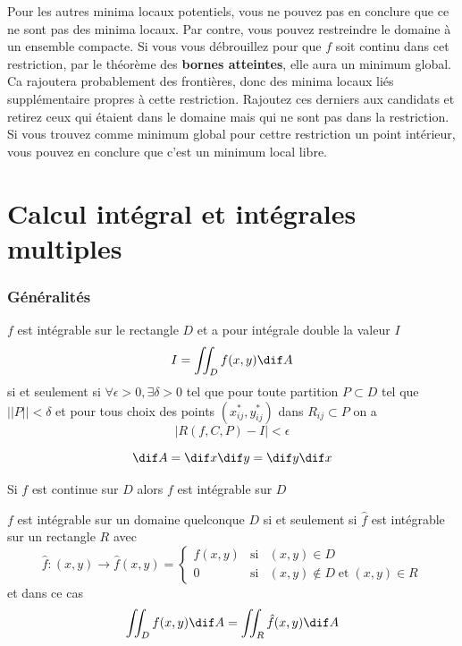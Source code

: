 Pour les autres minima locaux potentiels, vous ne pouvez pas en conclure que ce ne sont pas des minima locaux.
Par contre, vous pouvez restreindre le domaine à un ensemble compacte.
Si vous vous débrouillez pour que $f$ soit continu dans cet restriction, par le théorème des \textbf{bornes atteintes},
elle aura un minimum global.
Ca rajoutera probablement des frontières, donc des minima locaux liés supplémentaire propres à cette restriction.
Rajoutez ces derniers aux candidats et retirez ceux qui étaient dans le domaine mais qui ne sont pas dans la restriction.
Si vous trouvez comme minimum global pour cettre restriction un point intérieur,
vous pouvez en conclure que c'est un minimum local libre.


\part{Calcul intégral et intégrales multiples}

\section{Généralités}

\begin{mydef} $f$ est intégrable sur le rectangle $D$ et a pour intégrale double la valeur $I$
	\[ I = \iint_D f(x,y) \dif A \]
	si et seulement si $\forall \epsilon > 0, \exists \delta > 0$ tel que pour toute partition $P \subset D$ tel que $||P|| < \delta$ et pour tous choix des points $(x_{ij}^{*},y_{ij}^{*})$ dans $R_{ij} \subset P$ on a
	\[ |R(f,C,P) - I| < \epsilon \]
\end{mydef}

\begin{myrem}
	\[ \dif A = \dif x \dif y = \dif y \dif x \]
\end{myrem}

\begin{mytheo}
	Si $f$ est continue sur $D$ alors $f$ est intégrable sur $D$
\end{mytheo}

\begin{myprop} $f$ est intégrable sur un domaine quelconque $D$ si et seulement si $\hat{f}$ est intégrable sur un rectangle $R$ avec
	\[ \hat{f} : (x,y) \to \hat{f}(x,y) = \left\{
	\begin{array}{lll} f(x,y) & \text{si} & (x,y) \in D \\ 0 & \text{si} & (x,y) \notin D  \; \text{et} \; (x,y) \in R
	\end{array}
	\right.
	\]
	et dans ce cas
	\[ \iint_D f(x,y) \dif A = \iint_R \hat{f}(x,y) \dif A \]
\end{myprop}

